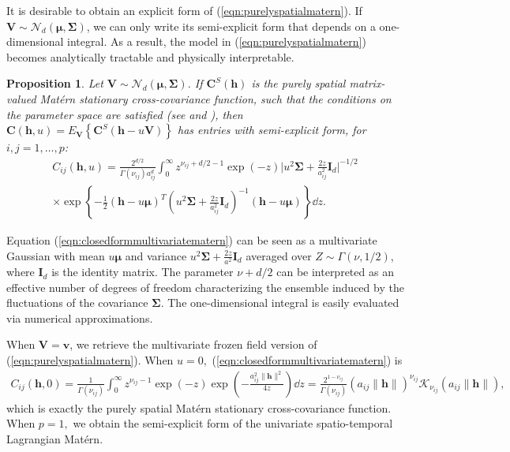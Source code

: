 \documentclass[12pt]{article}
\newcommand{\0}{\mathbf{0}}
\newtheorem{prop}{Proposition}
\begin{document}
It is desirable to obtain an explicit form of (\ref{eqn:purelyspatialmatern}). If $\mathbf{V}\sim\mathcal{N}_d\left(\boldsymbol{\mu},\boldsymbol{\Sigma}\right)$, we can only write its semi-explicit form that depends on a one-dimensional integral. As a result, the model in (\ref{eqn:purelyspatialmatern}) becomes analytically tractable and physically interpretable. 
\begin{prop}\label{prop:closedformmultivariatematern}
Let $\mathbf{V}\sim\mathcal{N}_d\left(\boldsymbol{\mu},\boldsymbol{\Sigma}\right)$. If $\mathbf{C}^S(\mathbf{h})$ is the purely spatial matrix-valued Mat\'{e}rn stationary cross-covariance function, such that the conditions on the parameter space are satisfied (see \citet{apanasovich2012valid} and \citet{gneiting2010matern}), then $\mathbf{C}(\mathbf{h},u)=E_{\mathbf{V}}\left\{\mathbf{C}^S(\mathbf{h}-u\mathbf{V})\right\}$ has entries with semi-explicit form, for $i,j=1,\ldots,p$:
\begin{multline}\label{eqn:closedformmultivariatematern}
C_{ij}(\mathbf{h},u)=\frac{2^{d/2}}{\Gamma\left(\nu_{ij}\right)a_{ij}^d}\int_0^{\infty}z^{\nu_{ij}+d/2-1} \exp\left(-z\right)\Big|u^2\boldsymbol{\Sigma}+\frac{2z}{a_{ij}^2}\mathbf{I}_{d}\Big|^{-1/2}\\
\times \exp\left\{-\frac{1}{2}(\mathbf{h}-u\boldsymbol{\mu})^T\left(u^2\boldsymbol{\Sigma}+\frac{2z}{a_{ij}^2}\mathbf{I}_{d}\right)^{-1}(\mathbf{h}-u\boldsymbol{\mu})\right\} \dd z.
\end{multline}
\end{prop}

Equation (\ref{eqn:closedformmultivariatematern}) can be seen as a multivariate Gaussian with mean $u\boldsymbol{\mu}$ and variance $u^2\boldsymbol{\Sigma}+\frac{2z}{a^2}\mathbf{I}_{d}$ averaged over $Z\sim\Gamma(\nu,1/2)$, where $\mathbf{I}_{d}$ is the identity matrix. The parameter $\nu+d/2$ can be interpreted as an effective number of degrees of freedom characterizing the ensemble induced by the fluctuations of the covariance $\boldsymbol{\Sigma}$. The one-dimensional integral is easily evaluated via numerical approximations. 

When $\mathbf{V}=\mathbf{v}$, we retrieve the multivariate frozen field version of (\ref{eqn:purelyspatialmatern}). 
When $u=0,$ (\ref{eqn:closedformmultivariatematern}) is 
\begin{eqnarray*}
C_{ij}\left(\mathbf{h},0\right)=\frac{1}{ \Gamma(\nu_{ij})} \int_0^{\infty}z^{\nu_{ij}-1} \exp\left(-z\right)\exp\left(-\frac{a_{ij}^2\|\mathbf{h}\|^2}{4z}\right)\dd z=\frac{2^{1-\nu_{ij}}}{ \Gamma(\nu_{ij})} \left(a_{ij}\|\mathbf{h}\|\right)^{\nu_{ij}}\mathcal{K}_{\nu_{ij}}\left(a_{ij}\|\mathbf{h}\|\right),
\end{eqnarray*}
which is exactly the purely spatial Mat\'{e}rn stationary cross-covariance function. When $p=1,$ we obtain the semi-explicit form of the univariate spatio-temporal Lagrangian Mat\'{e}rn. 
\end{document}
